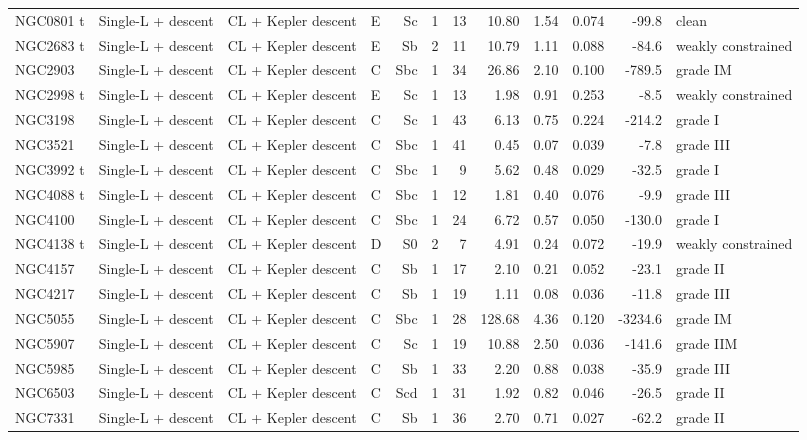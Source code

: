 \documentclass[10pt]{article}
\begin{document}
\begin{landscape}
{\begin{longtable}{llllrrrrrrrl}
\midrule
NGC0801 t & Single-L + descent & CL + Kepler descent & E & Sc & 1 & 13 & 10.80 & 1.54 & 0.074 & -99.8 & clean\\
NGC2683 t & Single-L + descent & CL + Kepler descent & E & Sb & 2 & 11 & 10.79 & 1.11 & 0.088 & -84.6 & weakly constrained\\
NGC2903 & Single-L + descent & CL + Kepler descent & C & Sbc & 1 & 34 & 26.86 & 2.10 & 0.100 & -789.5 & grade IM\\
NGC2998 t & Single-L + descent & CL + Kepler descent & E & Sc & 1 & 13 & 1.98 & 0.91 & 0.253 & -8.5 & weakly constrained\\
NGC3198 & Single-L + descent & CL + Kepler descent & C & Sc & 1 & 43 & 6.13 & 0.75 & 0.224 & -214.2 & grade I\\
NGC3521 & Single-L + descent & CL + Kepler descent & C & Sbc & 1 & 41 & 0.45 & 0.07 & 0.039 & -7.8 & grade III\\
NGC3992 t & Single-L + descent & CL + Kepler descent & C & Sbc & 1 & 9 & 5.62 & 0.48 & 0.029 & -32.5 & grade I\\
NGC4088 t & Single-L + descent & CL + Kepler descent & C & Sbc & 1 & 12 & 1.81 & 0.40 & 0.076 & -9.9 & grade III\\
NGC4100 & Single-L + descent & CL + Kepler descent & C & Sbc & 1 & 24 & 6.72 & 0.57 & 0.050 & -130.0 & grade I\\
NGC4138 t & Single-L + descent & CL + Kepler descent & D & S0 & 2 & 7 & 4.91 & 0.24 & 0.072 & -19.9 & weakly constrained\\
NGC4157 & Single-L + descent & CL + Kepler descent & C & Sb & 1 & 17 & 2.10 & 0.21 & 0.052 & -23.1 & grade II\\
NGC4217 & Single-L + descent & CL + Kepler descent & C & Sb & 1 & 19 & 1.11 & 0.08 & 0.036 & -11.8 & grade III\\
NGC5055 & Single-L + descent & CL + Kepler descent & C & Sbc & 1 & 28 & 128.68 & 4.36 & 0.120 & -3234.6 & grade IM\\
NGC5907 & Single-L + descent & CL + Kepler descent & C & Sc & 1 & 19 & 10.88 & 2.50 & 0.036 & -141.6 & grade IIM\\
NGC5985 & Single-L + descent & CL + Kepler descent & C & Sb & 1 & 33 & 2.20 & 0.88 & 0.038 & -35.9 & grade III\\
NGC6503 & Single-L + descent & CL + Kepler descent & C & Scd & 1 & 31 & 1.92 & 0.82 & 0.046 & -26.5 & grade II\\
NGC7331 & Single-L + descent & CL + Kepler descent & C & Sb & 1 & 36 & 2.70 & 0.71 & 0.027 & -62.2 & grade II\\

\end{longtable}}
\end{landscape}
\end{document}
